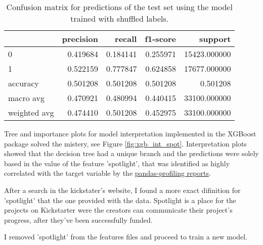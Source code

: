 \documentclass{article}
\begin{document}
\begin{itemize}
\begin{table}[h!]
\centering
\begin{tabular}{lrrrr}
\toprule
{} &  precision &    recall &  f1-score &       support \\
\midrule
0            &   0.419684 &  0.184141 &  0.255971 &  15423.000000 \\
1            &   0.522159 &  0.777847 &  0.624858 &  17677.000000 \\
accuracy     &   0.501208 &  0.501208 &  0.501208 &      0.501208 \\
macro avg    &   0.470921 &  0.480994 &  0.440415 &  33100.000000 \\
weighted avg &   0.474410 &  0.501208 &  0.452975 &  33100.000000 \\
\bottomrule
\end{tabular}
\caption{Confusion matrix for predictions of the test set using the model trained with shuffled labels.}
\label{table:model1_te_sh_cm}
\end{table}

Tree and importance plots for model interpretation implemented in the XGBoost package solved the mistery, see Figure \ref{fig:xgb_int_spot}. Interpretation plots showed that the decision tree had a unique branch and the predictions were solely based in the value of the feature 'spotlight', that was identified as highly correlated with the target variable by the \href{http://gloriagcurto.info/EDA_profiles}{pandas-profiling reports}.

After a search in the kickstater's website, I found a more exact difinition for 'spotlight' that the one provided with the data. Spotlight is a place for the projects on Kickstarter were the creators can communicate their project's progress, after they’ve been successfully funded.

I removed 'spotlight' from the features files and proceed to train a new model.


\end{itemize}
\end{document}
